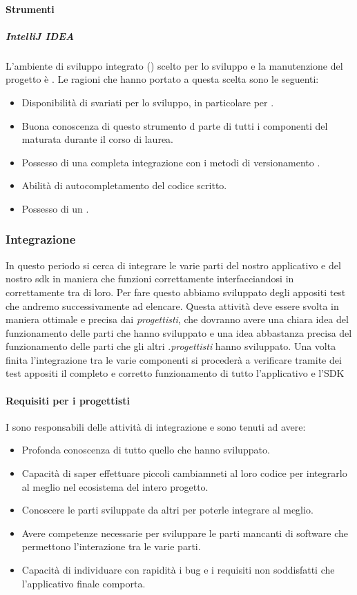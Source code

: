 \paragraph{Strumenti}

\subparagraph{IntelliJ IDEA}
L'ambiente di sviluppo integrato () scelto per lo sviluppo e la manutenzione del progetto è . Le ragioni che hanno portato a questa scelta sono le seguenti:
\begin{itemize}
\item Disponibilità di svariati  per lo sviluppo, in particolare per .
\item Buona conoscenza di questo strumento d parte di tutti i componenti del  maturata durante il corso di laurea.
\item Possesso di una completa integrazione con i metodi di versionamento .
\item Abilità di autocompletamento del codice  scritto.
\item Possesso di un  .
\end{itemize}

\subsubsection{Integrazione}
In questo periodo si cerca di integrare le varie parti del nostro applicativo e del nostro sdk in maniera che funzioni correttamente interfacciandosi in  correttamente tra di loro. Per fare questo abbiamo sviluppato degli appositi test che andremo successivamente ad elencare.
Questa attività deve essere svolta in maniera ottimale e precisa dai \textit{progettisti}, che dovranno avere una chiara idea del funzionamento delle parti che hanno sviluppato e una idea abbastanza precisa del funzionamento delle parti che gli altri .\textit{progettisti} hanno sviluppato. Una volta finita l'integrazione tra le varie componenti si procederà a verificare tramite dei test appositi il completo e corretto funzionamento di tutto l'applicativo e l'SDK

\paragraph{Requisiti per i progettisti}
I \textit{\ProgP} sono responsabili delle attività di integrazione e sono tenuti ad avere:
\begin{itemize}
\item
Profonda conoscenza di tutto quello che hanno sviluppato.
\item
Capacità di saper effettuare piccoli cambiamneti al loro codice per integrarlo al meglio nel ecosistema del intero progetto.
\item
Conoscere le parti sviluppate da altri per poterle integrare al meglio.
\item
Avere competenze necessarie per sviluppare le parti mancanti di software che permettono l'interazione tra le varie parti.
\item
Capacità di individuare con rapidità i bug e i requisiti non soddisfatti che l'applicativo finale comporta.
\end{itemize}


